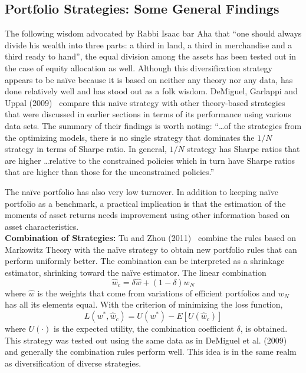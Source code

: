 \subsection{Portfolio Strategies: Some General Findings}



The following wisdom advocated by Rabbi Isaac bar Aha that ``one should always divide his wealth into three parts: a third in land, a third in merchandise and a third ready to hand'', the equal division among the assets has been tested out in the case of equity allocation as well. Although this diversification strategy appears to be na\"ive because it is based on neither any theory nor any data, has done relatively well and has stood out as a folk wisdom. DeMiguel, Garlappi and Uppal (2009)~\cite{demig} compare this na\"ive strategy with other theory-based strategies that were discussed in earlier sections in terms of its performance using various data sets. The summary of their findings is worth noting: ``\dots of the strategies from the optimizing models, there is no single strategy that dominates the $1/N$ strategy in terms of Sharpe ratio. In general, $1/N$ strategy has Sharpe ratios that are higher \dots relative to the constrained policies which in turn have Sharpe ratios that are higher than those for the unconstrained policies.''


The na\"ive portfolio has also very low turnover. In addition to keeping na\"ive portfolio as  a benchmark, a practical implication is that the estimation of the moments of asset returns needs improvement using other information based on asset characteristics. \\


\noindent \textbf{Combination of Strategies:} Tu and Zhou (2011)~\cite{jtu} combine the rules based on Markowitz Theory with the na\"ive strategy to obtain new portfolio rules that can perform uniformly better. The combination can be interpreted as a shrinkage estimator, shrinking toward the na\"ive estimator. The linear combination
	\begin{equation}\label{eqn:lincomb}
	\hat{w}_c = \delta \hat{w} + (1-\delta) w_N
	\end{equation}
where $\hat{w}$ is the weights that come from variations of efficient portfolios and $w_N$ has all its elements equal. With the criterion of minimizing the loss function, 
	\begin{equation}\label{eqn:lossfun}
	L(w^*,\hat{w}_c)= U(w^*) - E[U(\hat{w}_c)]
	\end{equation}
where $U(\cdot)$ is the expected utility, the combination coefficient $\delta$, is obtained. This strategy was tested out using the same data as in DeMiguel et al. (2009)~\cite{demig} and generally the combination rules perform well. This idea is in the same realm as diversification of diverse strategies. \\


